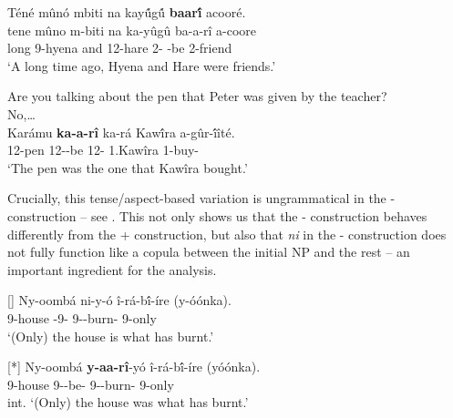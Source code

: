 \documentclass[output=paper]{langscibook}
\begin{document}
\ea
\label{bkm:Ref117604057}
Téné  mûnó  mbiti  na  kay\'{û}g\'{û} \textbf{baar\'{î}} acooré.\\
\gll
tene  mûno  m-biti  na  ka-yûgû ba-a-rî a-coore\\
long \INT{} 9-hyena  and  12-hare 2\SM-\PST{} -be 2-friend\\
\glt
‘A long time ago, Hyena and Hare were friends.’

\ex
\label{bkm:Ref117604067}
\begin{xlist}
 Are you talking about the pen that Peter was given by the teacher?\\
No,…\\
\gll
Karámu \textbf{ka-a-rî} ka-rá  Kaw\'{î}ra  a-gûr-\'{î}îté.\\
12-pen 12\SM{}-\PST{}-be 12-\RM{} 1.Kawîra 1\SM{}-buy-\PFV{}\\
\glt
‘The pen was the one that Kawîra bought.’
\end{xlist}

\z

Crucially, this tense/aspect-based variation is ungrammatical in the \NI-\PRO{} construction – see . This not only shows us that the \NI-\PRO{} construction behaves differently from the \NI+\RM{} construction, but also that \textit{ni} in the \NI-\PRO{} construction does not fully function like a copula between the initial NP and the rest – an important ingredient for the analysis.

\ea
\label{bkm:Ref111791469}
\ea
[]{
\label{bkm:Ref111791469:a}
\gll
Ny-oombá  ni-y-ó  î-rá-b\'{î}-íre  (y-óónka).\\
9-house \COP{}-9-\PRO{} 9\SM-\YPST{}-burn-\PFV{} {\db}9-only\\
\glt
‘(Only) the house is what has burnt.’
}

\ex
[*]{
\label{bkm:Ref111791469:b}
\gll
Ny-oombá \textbf{y-aa-rî}-yó  î-rá-b\'{î}-íre  (yóónka).\\
9-house 9\SM-\PST{}-be-\PRO{} 9\SM-\YPST{}-burn-\PFV{} {\db}9-only\\
\glt
int. ‘(Only) the house was what has burnt.’
}

\z
\z
\end{document}
